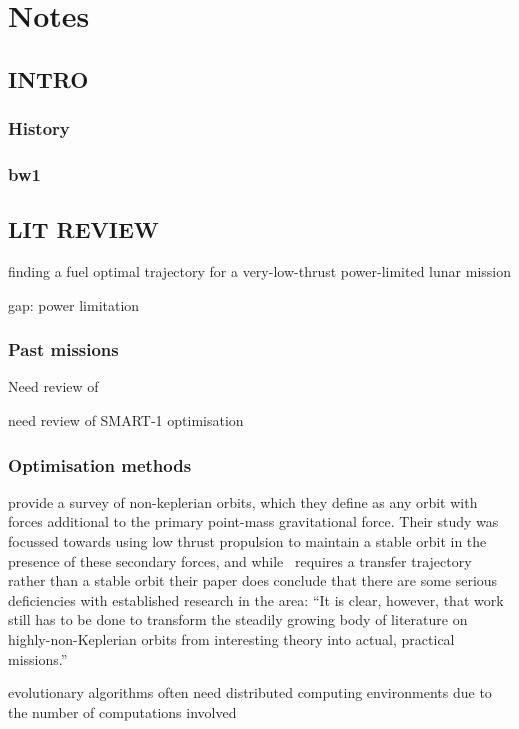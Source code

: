 
\chapter{Notes}
\section{INTRO}
\subsection{History}
\subsection{bw1}
\section{LIT REVIEW}
finding a fuel optimal trajectory for a very-low-thrust power-limited lunar mission

gap: power limitation

\subsection{Past missions}
Need review of \cite{Herman1998}

need review of SMART-1 optimisation \cite{Schoenmaekers2004}

\subsection{Optimisation methods}
\textcite{McKay2011} provide a survey of non-keplerian orbits, which they define as any orbit with forces additional to the primary point-mass gravitational force. Their study was focussed towards using low thrust propulsion to maintain a stable orbit in the presence of these secondary forces, and while \BW\ requires a transfer trajectory rather than a stable orbit their paper does conclude that there are some serious deficiencies with established research in the area:
\enquote{It is clear, however, that work still has to be done to transform the steadily growing body of literature on highly-non-Keplerian orbits from interesting theory into actual, practical missions.} 

evolutionary algorithms often need distributed computing environments due to the number of computations involved \textcite{Lee2005}

